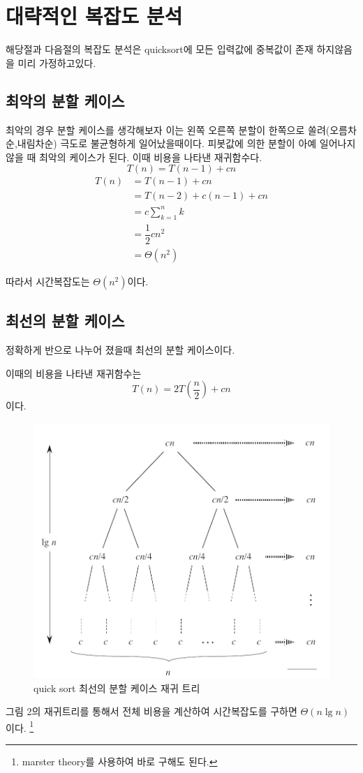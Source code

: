 
\section{대략적인 복잡도 분석}


해당절과 다음절의 복잡도 분석은 quicksort에 모든 입력값에 중복값이 존재 하지않음을 미리 가정하고있다.

\subsection{최악의 분할 케이스} 

최악의 경우 분할 케이스를 생각해보자 
이는 왼쪽 오른쪽 분할이 한쪽으로 쏠려(오름차순,내림차순) 극도로 불균형하게 일어났을때이다.
피봇값에 의한 분할이 아예 일어나지 않을 때 최악의 케이스가 된다.
이때 비용을 나타낸 재귀함수다.
$$T(n) = T(n-1) + cn $$
\begin{align*}
    T(n) &= T(n-1) + cn \\
    &= T(n-2) + c(n-1) +cn \\
    &= c\sum^{n}_{k=1}k \\
    &= \dfrac{1}{2} cn^{2}\\
    &= \Theta (n^{2})    
\end{align*}


따라서 시간복잡도는 $\Theta(n^2)$이다.

\subsection{최선의 분할 케이스} 

정확하게 반으로 나누어 졌을때 최선의 분할 케이스이다.

이때의 비용을 나타낸 재귀함수는
$$T(n) = 2T(\dfrac{n}{2}) + cn$$
이다.

\begin{figure}[h!]
    \centering
    \includegraphics[scale=0.5]{./QuickSort/pic/q2.png}
    \caption{quick sort 최선의 분할 케이스 재귀 트리\cite{reference1}}
\end{figure}
그림 2의 재귀트리를 통해서 전체 비용을 계산하여 시간복잡도를 구하면 $\Theta(n \lg n)$이다. \footnote{marster theory를 사용하여 바로 구해도 된다.}

